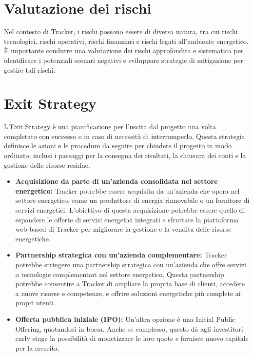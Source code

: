 \documentclass[oneside]{book}
\begin{document}
\section{Valutazione dei rischi}
Nel contesto di Tracker, i rischi possono essere di diversa natura, tra cui rischi tecnologici, rischi operativi, rischi finanziari e rischi legati all'ambiente energetico. È importante condurre una valutazione dei rischi approfondita e sistematica per identificare i potenziali scenari negativi e sviluppare strategie di mitigazione per gestire tali rischi.

\section{Exit Strategy}
L'Exit Strategy è una pianificazione per l'uscita dal progetto una volta completato con successo o in caso di necessità di interromperlo. Questa strategia definisce le azioni e le procedure da seguire per chiudere il progetto in modo ordinato, inclusi i passaggi per la consegna dei risultati, la chiusura dei conti e la gestione delle risorse residue.

\begin{itemize}
    \item \textbf{Acquisizione da parte di un'azienda consolidata nel settore energetico:} Tracker potrebbe essere acquisita da un'azienda che opera nel settore energetico, come un produttore di energia rinnovabile o un fornitore di servizi energetici. L'obiettivo di questa acquisizione potrebbe essere quello di espandere le offerte di servizi energetici integrati e sfruttare la piattaforma web-based di Tracker per migliorare la gestione e la vendita delle risorse energetiche.

    \item \textbf{Partnership strategica con un'azienda complementare:} Tracker potrebbe stringere una partnership strategica con un'azienda che offre servizi o tecnologie complementari nel settore energetico. Questa partnership potrebbe consentire a Tracker di ampliare la propria base di clienti, accedere a nuove risorse e competenze, e offrire soluzioni energetiche più complete ai propri utenti.

    \item \textbf{Offerta pubblica iniziale (IPO):} Un'altra opzione è una Initial Public Offering, quotandosi in borsa. Anche se complesso, questo dà agli investitori early stage la possibilità di monetizzare le loro quote e fornisce nuovo capitale per la crescita.

\end{itemize}
\end{document}
